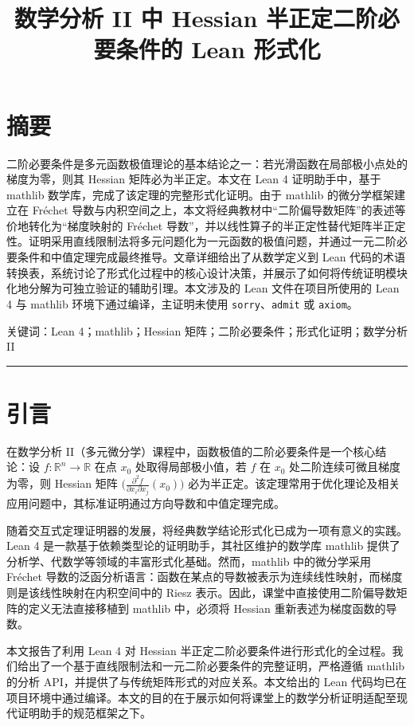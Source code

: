 ﻿\documentclass[UTF8,a4paper,zihao=-4]{ctexart}
\title{数学分析 II 中 Hessian 半正定二阶必要条件的 Lean 形式化}
\author{}
\date{}
\begin{document}
\maketitle
\tableofcontents
\clearpage

\section*{摘要}
二阶必要条件是多元函数极值理论的基本结论之一：若光滑函数在局部极小点处的梯度为零，则其 Hessian 矩阵必为半正定。本文在 Lean 4 证明助手中，基于 mathlib 数学库，完成了该定理的完整形式化证明。由于 mathlib 的微分学框架建立在 Fréchet 导数与内积空间之上，本文将经典教材中“二阶偏导数矩阵”的表述等价地转化为“梯度映射的 Fréchet 导数”，并以线性算子的半正定性替代矩阵半正定性。证明采用直线限制法将多元问题化为一元函数的极值问题，并通过一元二阶必要条件和中值定理完成最终推导。文章详细给出了从数学定义到 Lean 代码的术语转换表，系统讨论了形式化过程中的核心设计决策，并展示了如何将传统证明模块化地分解为可独立验证的辅助引理。本文涉及的 Lean 文件在项目所使用的 Lean 4 与 mathlib 环境下通过编译，主证明未使用 \texttt{sorry}、\texttt{admit} 或 \texttt{axiom}。

\noindent 关键词：Lean 4；mathlib；Hessian 矩阵；二阶必要条件；形式化证明；数学分析 II

\bigskip\hrule\bigskip

\section{引言}
在数学分析 II（多元微分学）课程中，函数极值的二阶必要条件是一个核心结论：设 \(f:\mathbb{R}^n\to\mathbb{R}\) 在点 \(x_0\) 处取得局部极小值，若 \(f\) 在 \(x_0\) 处二阶连续可微且梯度为零，则 Hessian 矩阵 \(\big(\frac{\partial^2 f}{\partial x_i\partial x_j}(x_0)\big)\) 必为半正定。该定理常用于优化理论及相关应用问题中，其标准证明通过方向导数和中值定理完成。

随着交互式定理证明器的发展，将经典数学结论形式化已成为一项有意义的实践。Lean 4 是一款基于依赖类型论的证明助手，其社区维护的数学库 mathlib 提供了分析学、代数学等领域的丰富形式化基础。然而，mathlib 中的微分学采用 Fréchet 导数的泛函分析语言：函数在某点的导数被表示为连续线性映射，而梯度则是该线性映射在内积空间中的 Riesz 表示。因此，课堂中直接使用二阶偏导数矩阵的定义无法直接移植到 mathlib 中，必须将 Hessian 重新表述为梯度函数的导数。

本文报告了利用 Lean 4 对 Hessian 半正定二阶必要条件进行形式化的全过程。我们给出了一个基于直线限制法和一元二阶必要条件的完整证明，严格遵循 mathlib 的分析 API，并提供了与传统矩阵形式的对应关系。本文给出的 Lean 代码均已在项目环境中通过编译。本文的目的在于展示如何将课堂上的数学分析证明适配至现代证明助手的规范框架之下。
\end{document}
